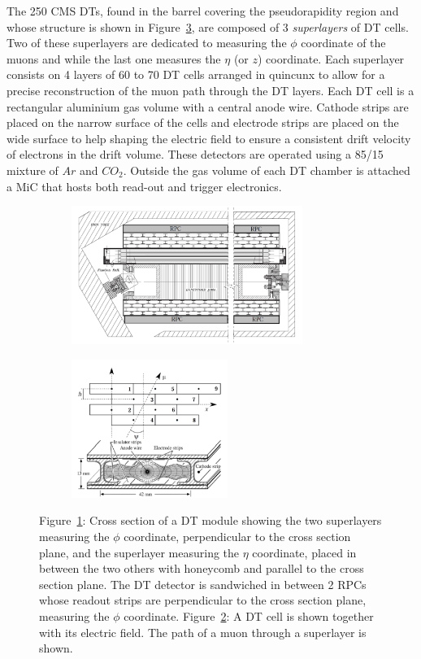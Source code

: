 	The 250 CMS DTs, found in the barrel covering the pseudorapidity region  and whose structure is shown in Figure~\ref{fig:DT}, are composed of 3 \textit{superlayers} of DT cells. Two of these superlayers are dedicated to measuring the $\phi$ coordinate of the muons and while the last one measures the $\eta$ (or $z$) coordinate. Each superlayer consists on 4 layers of 60 to 70 DT cells arranged in quincunx to allow for a precise reconstruction of the muon path through the DT layers. Each DT cell is a rectangular aluminium gas volume with a central anode wire. Cathode strips are placed on the narrow surface of the cells and electrode strips are placed on the wide surface to help shaping the electric field to ensure a consistent drift velocity of electrons in the drift volume. These detectors are operated using a 85/15 mixture of $Ar$ and $CO_2$. Outside the gas volume of each DT chamber is attached a \acf{MiC} that hosts both read-out and trigger electronics.
	
	\begin{figure}[H]
		\begin{subfigure}{0.6\linewidth}
			\centering
			\includegraphics[height = 4.5cm]{fig/chapt3/DT_layout.png}
			\caption{\label{fig:DT:A}}
		\end{subfigure}
		\begin{subfigure}{0.4\linewidth}
			\centering
			\includegraphics[height = 4.5cm]{fig/chapt3/DT_cells.png}
			\caption{\label{fig:DT:B}}
		\end{subfigure}
		\caption{\label{fig:DT} Figure~\ref{fig:DT:A}: Cross section of a DT module showing the two superlayers measuring the $\phi$ coordinate, perpendicular to the cross section plane, and the superlayer measuring the $\eta$ coordinate, placed in between the two others with honeycomb and parallel to the cross section plane. The DT detector is sandwiched in between 2 RPCs whose readout strips are perpendicular to the cross section plane, measuring the $\phi$ coordinate. Figure~\ref{fig:DT:B}: A DT cell is shown together with its electric field. The path of a muon through a superlayer is shown.}
	\end{figure}
	
